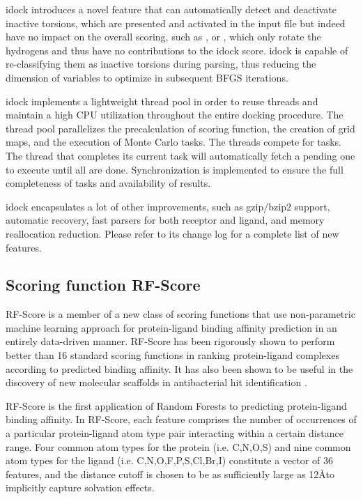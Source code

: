 \documentclass[10pt]{article}
\begin{document}
idock introduces a novel feature that can automatically detect and deactivate inactive torsions, which are presented and activated in the input file but indeed have no impact on the overall scoring, such as ,  or , which only rotate the hydrogens and thus have no contributions to the idock score. idock is capable of re-classifying them as inactive torsions during parsing, thus reducing the dimension of variables to optimize in subsequent BFGS iterations.

idock implements a lightweight thread pool in order to reuse threads and maintain a high CPU utilization throughout the entire docking procedure. The thread pool parallelizes the precalculation of scoring function, the creation of grid maps, and the execution of Monte Carlo tasks. The threads compete for tasks. The thread that completes its current task will automatically fetch a pending one to execute until all are done. Synchronization is implemented to ensure the full completeness of tasks and availability of results.

idock encapsulates a lot of other improvements, such as gzip/bzip2 support, automatic recovery, fast parsers for both receptor and ligand, and memory reallocation reduction. Please refer to its change log for a complete list of new features.

\subsection*{Scoring function RF-Score}
RF-Score \cite{564} is a member of a new class of scoring functions that use non-parametric machine learning approach for protein-ligand binding affinity prediction in an entirely data-driven manner. RF-Score has been rigorously shown \cite{564,908} to perform better than 16 standard scoring functions in ranking protein-ligand complexes according to predicted binding affinity. It has also been shown to be useful in the discovery of new molecular scaffolds in antibacterial hit identification \cite{1281}.

RF-Score is the first application of Random Forests \cite{1309} to predicting protein-ligand binding affinity. In RF-Score, each feature comprises the number of occurrences of a particular protein-ligand atom type pair interacting within a certain distance range. Four common atom types for the protein (i.e. C,N,O,S) and nine common atom types for the ligand (i.e. C,N,O,F,P,S,Cl,Br,I) constitute a vector of 36 features, and the distance cutoff is chosen to be as sufficiently large as 12\AA to implicitly capture solvation effects.
\end{document}
